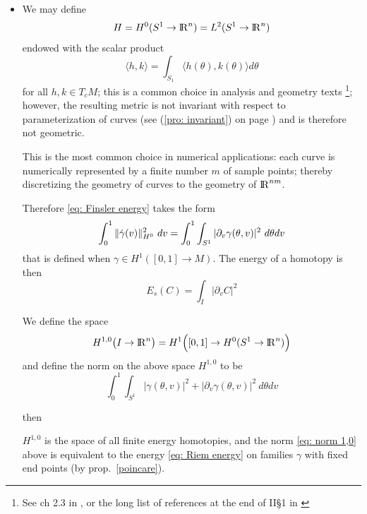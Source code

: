 \documentclass[twoside,a4paper,english]{article}
\def\derpar#1{\partial_{#1}}
\begin{document}
\begin{itemize}
\item  We may define 
  $$H=H^0(S^1\to{\protect\mathrm{l\hskip-0.15em R}}^n)=L^2(S^1\to{\protect\mathrm{l\hskip-0.15em R}}^n)$$ 
  endowed  with the scalar product
  \begin{equation}
    \langle h,k\rangle = \int_{S_1} \langle h(\theta),k(\theta)\rangle
    d\theta \label{eq:paramH0}  
  \end{equation}
  for all $h,k\in T_c M$;
  this is a common choice in analysis and geometry texts%
  \footnote{See ch 2.3 in \cite{WK:RieGeo}, or the long list of references at
  the end of II\S1 in \cite{Lang:FDG}};
  however,  the resulting metric is not invariant with respect to
  parameterization of curves (see (\ref{pro: invariant}) on page
  \pageref{pro: invariant}) and is therefore not geometric.

  \begin{Remark}
    This is the most common choice in numerical applications:
    each curve is numerically
    represented by a finite number $m$ of sample points; thereby
    discretizing the geometry of curves to the geometry of
    ${\protect\mathrm{l\hskip-0.15em R}}^{nm}$.
  \end{Remark}

  Therefore \eqref{eq: Finsler energy} takes the form
  \begin{equation}
    \int_0^1 \|\overdot \gamma(v)\|_{H^0}^2 ~dv
    = \int_0^1\int_{S^1} | \derpar v \gamma(\theta,v)|^2 ~d\theta dv
    \label{eq: Riem energy}
  \end{equation}
  that is defined when $\gamma \in H^1([0,1]\to M)$.
  The energy of a homotopy is then
  $$E_s(C) =  \int_I |\derpar v C| ^2 $$



  \begin{Definition}
    We define the space $$H^{1,0}\big(I\to{\protect\mathrm{l\hskip-0.15em R}}^n\big) =
    H^1\Big([0,1]\to H^0(S^1\to {\protect\mathrm{l\hskip-0.15em R}}^n)\Big)$$
    and define the norm on
    the above space $H^{1,0}$ to be
    \begin{equation}
      \int_0^1 \int_{S^1}
      |\gamma(\theta,v) |^2+ |\derpar v \gamma(\theta,v) |^2~d\theta dv
      \label{eq: norm 1,0}
    \end{equation}
  \end{Definition}
  then
  \begin{Proposition}\label{prop: H 1 0 equiv homotopies}
    $H^{1,0}$ is the space of all finite energy homotopies,
    and the norm \eqref{eq: norm 1,0} above is equivalent
    to the energy \eqref{eq: Riem energy} on families $\gamma$ with
    fixed end points (by prop.~\ref{poincare}).
  \end{Proposition}


\end{itemize}
\end{document}
